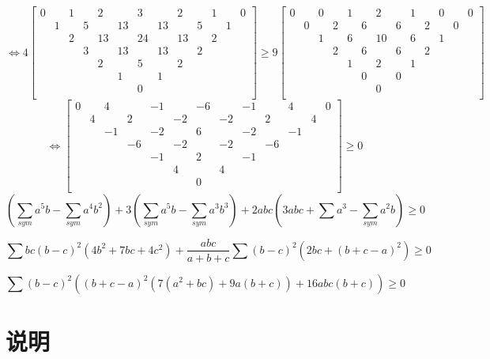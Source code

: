 \documentclass[UTF8]{ctexart}
\begin{document}
$$\Leftrightarrow 
4\left[
\begin{smallmatrix}
	0& &1& &2& &3& &2& &1& &0\\
	&1& &5& &13& &13& &5& &1&\\
	& &2& &13& &24& &13& &2& &\\
	& & &3& &13& &13& &2& & &\\
	& & & &2& &5& &2& & & &\\
	& & & & &1& &1& & & & &\\
	& & & & & &0& & & & & &\\
\end{smallmatrix}
\right]\geq 9
\left[
\begin{smallmatrix}
	0& &0& &1& &2& &1& &0& &0\\
	&0& &2& &6& &6& &2& &0&\\
	& &1& &6& &10& &6& &1& &\\
	& & &2& &6& &6& &2& & &\\
	& & & &1& &2& &1& & & &\\
	& & & & &0& &0& & & & &\\
	& & & & & &0& & & & & &\\
\end{smallmatrix}
\right]
$$
$$\Leftrightarrow 
\left[
\begin{smallmatrix}
	0& &4& &-1& &-6& &-1& &4& &0\\
	&4& &2& &-2& &-2& &2& &4&\\
	& &-1& &-2& &6& &-2& &-1& &\\
	& & &-6& &-2& &-2& &-6& & &\\
	& & & &-1& &2& &-1& & & &\\
	& & & & &4& &4& & & & &\\
	& & & & & &0& & & & & &\\
\end{smallmatrix}
\right]\geq 0
$$
$$ (\displaystyle \sum _{sym} a^{5}b-\displaystyle \sum _{sym}a^{4}b^{2})+3(\displaystyle \sum _{sym}a^{5}b-\displaystyle \sum _{sym}a^{3}b^{3})+2abc(3abc+\displaystyle \sum a^{3}-\displaystyle \sum _{sym}a^{2}b)\geq 0 $$

$$ \displaystyle \sum bc(b-c)^{2}(4b^{2}+7bc+4c^{2})+\dfrac{abc}{a+b+c}
\displaystyle \sum (b-c)^{2}(2bc+(b+c-a)^{2}) \ge 0$$

$$ \displaystyle \sum (b-c)^{2}((b+c-a)^{2}(7(a^{2}+bc)+9a(b+c))+16abc(b+c))\ge 0
$$
\newpage
\tableofcontents
\newpage
\section{说明} 
\end{document}
